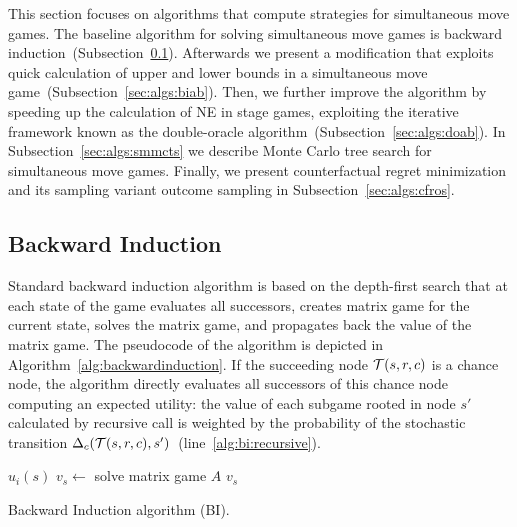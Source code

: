 
This section focuses on algorithms that compute strategies for simultaneous move games. 
The baseline algorithm for solving simultaneous move games is backward induction~(Subsection~\ref{sec:algs:bi}).
Afterwards we present a modification that exploits quick calculation of upper and lower bounds in a simultaneous move game~(Subsection~\ref{sec:algs:biab}).
Then, we further improve the algorithm by speeding up the calculation of NE in stage games, exploiting the iterative framework known as the double-oracle algorithm~(Subsection~\ref{sec:algs:doab}).
In Subsection~\ref{sec:algs:smmcts} we describe Monte Carlo tree search for simultaneous move games. 
Finally, we present counterfactual regret minimization and its sampling variant outcome sampling in Subsection~\ref{sec:algs:cfros}. 


\subsection{Backward Induction}\label{sec:algs:bi}

Standard backward induction algorithm is based on the depth-first search that at each state of the game evaluates all successors, creates matrix game for the current state, solves the matrix game, and propagates back the value of the matrix game. The pseudocode of the algorithm is depicted in Algorithm~\ref{alg:backwardinduction}. If the succeeding node $\mathcal{T}(s,r,c)$ is a chance node, the algorithm directly evaluates all successors of this chance node computing an expected utility: the value of each subgame rooted in node $s'$ calculated by recursive call is weighted by the probability of the stochastic transition $\Delta_c(\mathcal{T}(s,r,c),s')$~(line~\ref{alg:bi:recursive}).

\begin{algorithm2e}[t]
\small
{}
 {\Return $u_i(s)$} \label{alg:bi:stop1}
$v_s \leftarrow$ solve matrix game $A$\;
\Return $v_s$ \label{alg:bi:stop2}
\caption{Backward Induction algorithm (BI).}\label{alg:backwardinduction}
\end{algorithm2e}


